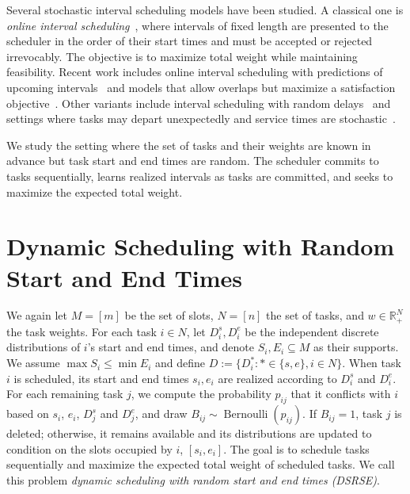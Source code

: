 \documentclass[final,5p,times,twocolumn]{elsarticle}
\newcommand{\R}{\mathbb{R}}
\begin{document}
Several stochastic interval scheduling models have been studied.
A classical one is \emph{online interval scheduling}~\cite{Lipton1994OnlineIS}, where intervals of fixed length are presented to the scheduler in the order of their start times and must be accepted or rejected irrevocably.
The objective is to maximize total weight while maintaining feasibility.
Recent work includes online interval scheduling with predictions of upcoming intervals~\cite{boyar2025onlineintervalschedulingpredictions} and models that allow overlaps but maximize a satisfaction objective~\cite{KOBAYASHI2020673}.
Other variants include interval scheduling with random delays~\cite{BRANDA2024106542} and settings where tasks may depart unexpectedly and service times are stochastic~\cite{xu2024stochasticschedulingabandonmentsgreedy}.

We study the setting where the set of tasks and their weights are known in advance but task start and end times are random.
The scheduler commits to tasks sequentially, learns realized intervals as tasks are committed, and seeks to maximize the expected total weight.

\section{Dynamic Scheduling with Random Start and End Times}
We again let $M=[m]$ be the set of slots, $N=[n]$ the set of tasks, and $w\in\R_{+}^{N}$ the task weights. 
For each task $i\in N$, let $D_i^s,D_i^e$ be the independent discrete distributions of $i$'s start and end times, and denote $S_i,E_i\subseteq M$ as their supports.
We assume $\max S_i\leq \min E_i$ and define $D:=\{D_i^*:*\in\{s,e\},i\in N\}$.
When task $i$ is scheduled, its start and end times $s_i,e_i$ are realized according to $D_i^s$ and $D_i^e$. 
For each remaining task $j$, we compute the probability $p_{ij}$ that it conflicts with $i$ based on $s_i$, $e_i$, $D_j^s$ and $D_j^e$, and draw $B_{ij}\sim\operatorname{Bernoulli}(p_{ij})$.
If $B_{ij}=1$, task $j$ is deleted; otherwise, it remains available and its distributions are updated to condition on the slots occupied by $i$, $[s_i, e_i]$. 
The goal is to schedule tasks sequentially and maximize the expected total weight of scheduled tasks.
We call this problem \emph{dynamic scheduling with random start and end times (DSRSE)}.
\end{document}
